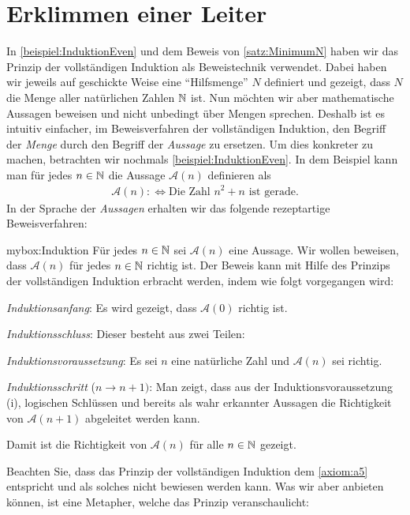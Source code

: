 \section{Erklimmen einer Leiter}
In \cref{beispiel:InduktionEven} und dem Beweis von \cref{satz:MinimumN} haben wir das Prinzip der vollständigen Induktion als Beweistechnik verwendet. Dabei haben wir jeweils auf geschickte Weise eine \enquote{Hilfsmenge} $N$ definiert und gezeigt, dass $N$ die Menge aller natürlichen Zahlen $\mathbb{N}$ ist. Nun möchten wir aber mathematische Aussagen beweisen und nicht unbedingt über Mengen sprechen. Deshalb ist es intuitiv einfacher, im Beweisverfahren der vollständigen Induktion, den Begriff der \textit{Menge} durch den Begriff der \textit{Aussage} zu ersetzen. Um dies konkreter zu machen, betrachten wir nochmals \cref{beispiel:InduktionEven}. In dem Beispiel kann man für jedes $n\in\mathbb{N}$ die Aussage $\mathcal{A}(n)$ definieren als
\begin{align*}
    \mathcal{A}(n) :\iff \text{Die Zahl $n^2 + n$ ist gerade}.
\end{align*}
In der Sprache der \textit{Aussagen} erhalten wir das folgende rezeptartige Beweisverfahren:
\begin{myBox}{mybox:Induktion}
Für jedes $n\in\mathbb{N}$ sei $\mathcal{A}(n)$ eine Aussage. Wir wollen beweisen, dass $\mathcal{A}(n)$ für jedes $n\in\mathbb{N}$ richtig ist. Der Beweis kann mit Hilfe des Prinzips der vollständigen Induktion erbracht werden, indem wie folgt vorgegangen wird:
\begin{aenum}
    \item \textit{Induktionsanfang}: Es wird gezeigt, dass $\mathcal{A}(0)$ richtig ist.
    \item \textit{Induktionsschluss}: Dieser besteht aus zwei Teilen:
        \begin{renum}
            \item \textit{Induktionsvoraussetzung}: Es sei $n$ eine natürliche Zahl und $\mathcal{A}(n)$ sei richtig.
            \item \textit{Induktionsschritt} ($n\to n+1)$: Man zeigt, dass aus der Induktionsvoraussetzung (i), logischen Schlüssen und bereits als wahr erkannter Aussagen die Richtigkeit von $\mathcal{A}(n+1)$ abgeleitet werden kann.
        \end{renum}
\end{aenum}
Damit ist die Richtigkeit von $\mathcal{A}(n)$ für alle $n\in\mathbb{N}$ gezeigt.
\end{myBox}
Beachten Sie, dass das Prinzip der vollständigen Induktion dem \cref{axiom:a5} entspricht und als solches nicht bewiesen werden kann. Was wir aber anbieten können, ist eine Metapher, welche das Prinzip veranschaulicht:
